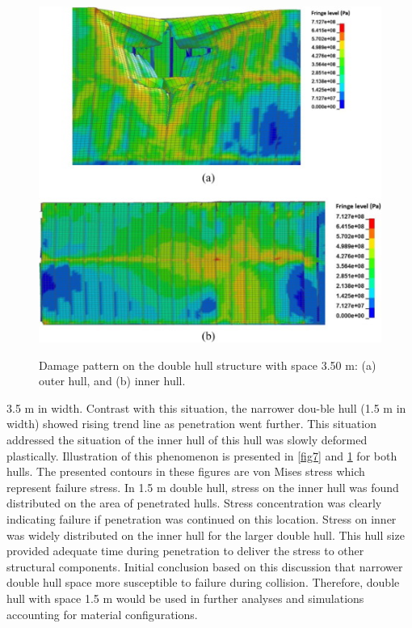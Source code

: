 \documentclass[../Final.tex]{subfiles}
\begin{document}
\begin{figure}[h]
    \centering
    \includegraphics[width=\columnwidth]{fig8.jpg}
    \label{fig8}
    \caption{Damage pattern on the double hull structure with space 3.50 m: (a) outer hull, and (b) inner hull.}
\end{figure}

3.5 m in width. Contrast with this situation, the narrower dou-ble hull (1.5 m in width) showed rising trend line as penetration went further. 
This situation addressed the situation of the inner hull of this hull was slowly deformed plastically. Illustration of this phenomenon is presented in \ref{fig7} and \ref{fig8} for both hulls. 
The presented contours in these figures are von Mises stress which represent failure stress. In 1.5 m double hull, stress on the inner hull was found distributed on the area of penetrated hulls. 
Stress concentration was clearly indicating failure if pen­etration was continued on this location. 
Stress on inner was widely distributed on the inner hull for the larger double hull. This hull size provided adequate time during penetration to deliver the stress to other structural components. 
Initial conclusion based on this discussion that narrower double hull space more susceptible to failure during collision. 
Therefore, double hull with space 1.5 m would be used in further analyses and simulations accounting for material configurations. 
\end{document}

